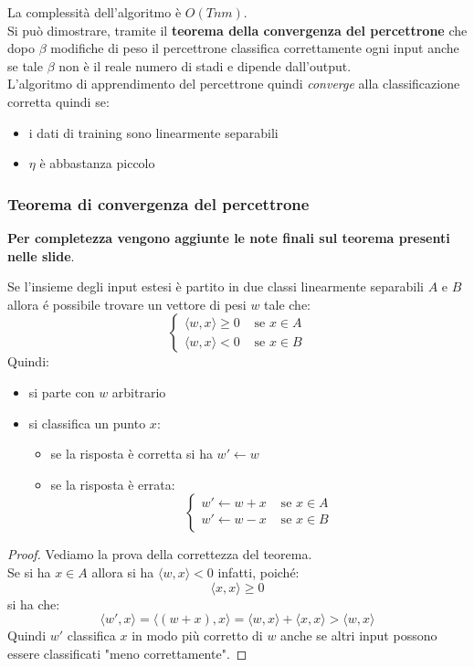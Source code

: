 \documentclass[a4paper,12pt, oneside]{book}
\begin{document}
La complessità dell'algoritmo è $O(Tnm)$.\\
Si può dimostrare, tramite il \textbf{teorema della convergenza del percettrone}
che dopo $\beta$ modifiche di peso il percettrone classifica 
correttamente ogni input anche se tale $\beta$ non è il reale numero di stadi e
dipende dall'output.\\
L'algoritmo di apprendimento del percettrone quindi \textit{converge} alla
classificazione corretta quindi se:
\begin{itemize}
  \item i dati di training sono linearmente separabili
  \item $\eta$ è abbastanza piccolo
\end{itemize}
\subsubsection{Teorema di convergenza del percettrone}
\textbf{Per completezza vengono aggiunte le note finali sul teorema presenti
  nelle slide}.
\begin{teorema}
  Se l'insieme degli input estesi è partito in due classi linearmente separabili
  $A$ e $B$ allora é possibile trovare un vettore di pesi $w$ tale che:
  \[
    \begin{cases}
      \langle w, x\rangle\geq 0&\mbox{ se }x\in A\\
      \langle w, x\rangle < 0&\mbox{ se }x\in B
    \end{cases}
  \]
  Quindi:
  \begin{itemize}
    \item si parte con $w$ arbitrario
    \item si classifica un punto $x$:
    \begin{itemize}
      \item se la risposta è corretta si ha $w'\gets w$
      \item se la risposta è errata:
      \[
        \begin{cases}
          w'\gets w+x&\mbox{ se }x\in A\\
          w'\gets w-x&\mbox{ se }x\in B\\
        \end{cases}
      \]
    \end{itemize}
  \end{itemize}

\end{teorema}
\begin{proof}
  Vediamo la prova della correttezza del teorema.\\
  Se si ha $x\in A$ allora si ha $\langle w, x\rangle<0$ infatti, poiché:
  \[\langle x, x\rangle\geq 0\]
  si ha che:
  \[\langle w', x\rangle=\langle (w+x), x\rangle=\langle w, x\rangle+\langle x,
    x\rangle>\langle w, x\rangle\]
  Quindi $w'$ classifica $x$ in modo più corretto di $w$ anche se altri input
  possono essere classificati "meno correttamente".
\end{proof}
\end{document}

